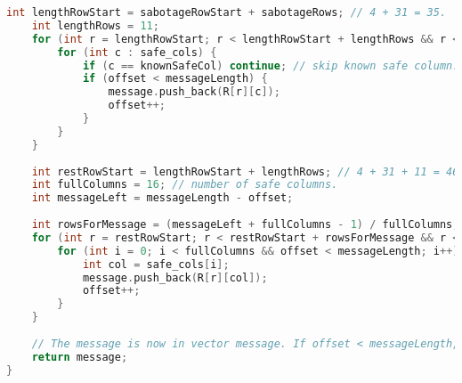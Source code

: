 \begin{lstlisting}[language=C++]
    int lengthRowStart = sabotageRowStart + sabotageRows; // 4 + 31 = 35.
    int lengthRows = 11;
    for (int r = lengthRowStart; r < lengthRowStart + lengthRows && r < n; r++) {
        for (int c : safe_cols) {
            if (c == knownSafeCol) continue; // skip known safe column.
            if (offset < messageLength) {
                message.push_back(R[r][c]);
                offset++;
            }
        }
    }
 
    int restRowStart = lengthRowStart + lengthRows; // 4 + 31 + 11 = 46.
    int fullColumns = 16; // number of safe columns.
    int messageLeft = messageLength - offset;
 
    int rowsForMessage = (messageLeft + fullColumns - 1) / fullColumns; // number of rows needed.
    for (int r = restRowStart; r < restRowStart + rowsForMessage && r < n; r++) {
        for (int i = 0; i < fullColumns && offset < messageLength; i++) {
            int col = safe_cols[i];
            message.push_back(R[r][col]);
            offset++;
        }
    }
 
    // The message is now in vector message. If offset < messageLength, we did not get all bits. but we should.
    return message;
}
\end{lstlisting}
